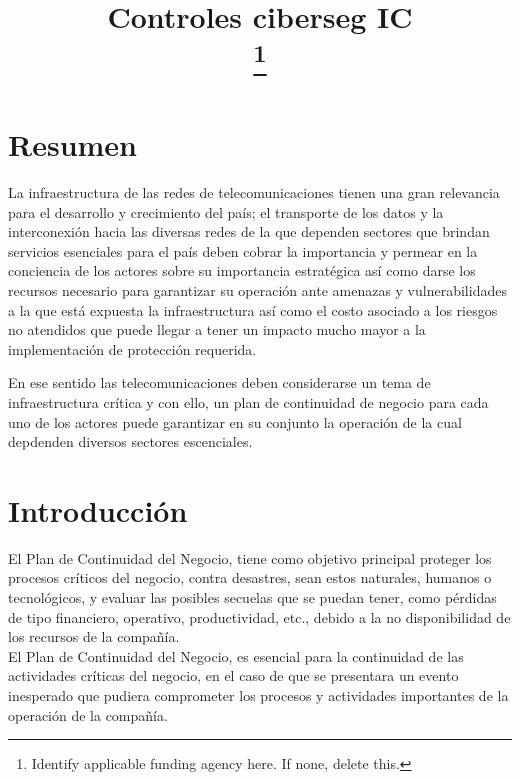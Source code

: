 \documentclass[conference]{IEEEtran}
\begin{document}
\title{Controles ciberseg IC\\

\thanks{Identify applicable funding agency here. If none, delete this.}
}

\author{
\and
{}
\and
{}
}

\maketitle

\section{Resumen}
La infraestructura de las redes de telecomunicaciones tienen una gran relevancia para el desarrollo y crecimiento del país; el transporte de los datos y la interconexión hacia las diversas redes de la que dependen sectores que brindan servicios esenciales para el país deben cobrar la importancia y permear en la conciencia de los actores sobre su importancia estratégica así como darse los recursos necesario para garantizar su operación ante amenazas y vulnerabilidades a la que está expuesta la infraestructura así como el costo asociado a los riesgos no atendidos que puede llegar a tener un impacto mucho mayor a la implementación de protección requerida. 

En ese sentido las telecomunicaciones deben considerarse un tema de infraestructura crítica y con ello,  un plan de continuidad de negocio para cada uno de los actores puede garantizar en su conjunto la operación de la cual depdenden diversos sectores escenciales.

\section{Introducción}
El  Plan  de  Continuidad  del  Negocio,  tiene  como  objetivo  principal  proteger  los  procesos  críticos  del  negocio,   contra   desastres,   sean   estos   naturales,   humanos  o  tecnológicos,  y  evaluar  las    posibles  secuelas  que  se  puedan  tener,  como  pérdidas  de  tipo  financiero, operativo, productividad, etc., debido a la no disponibilidad de los recursos de la compañía. \\ El  Plan  de  Continuidad  del  Negocio,  es  esencial  para  la  continuidad  de    las  actividades  críticas  del  negocio,  en  el  caso  de  que  se  presentara  un  evento    inesperado  que  pudiera  comprometer  los  procesos  y  actividades   importantes   de   la   operación   de   la   compañía.
\end{document}
